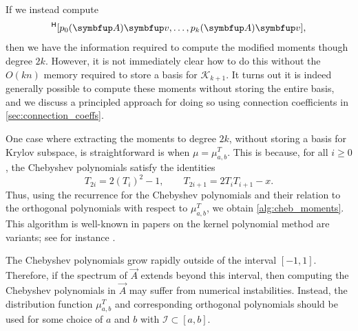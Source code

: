     If we instead compute 
    \begin{equation*}
        [ p_0\A\vec{v}, \ldots, p_{k}\A\vec{v}]^\cT
        [ p_0\A\vec{v}, \ldots, p_{k}\A\vec{v}],
    \end{equation*}
    then we have the information required to compute the modified moments though degree \( 2k \).
    However, it is not immediately clear how to do this without the \( O(kn) \) memory required to store a basis for \( \mathcal{K}_{k+1} \).
    It turns out it is indeed generally possible to compute these moments without storing the entire basis, and we discuss a principled approach for doing so using connection coefficients in \cref{sec:connection_coeffs}.

    One case where extracting the moments to degree \( 2k \), without storing a basis for Krylov subspace, is straightforward is when \( \mu = \mu_{a,b}^T \).
    This is because, for all \( i \geq 0 \), the Chebyshev polynomials satisfy the identities
    \begin{equation*}
        T_{2i} = 2 (T_i)^2 - 1 
        ,\qquad
        T_{2i+1} = 2 T_i T_{i+1} - x. 
    \end{equation*}
    Thus, using the recurrence for the Chebyshev polynomials and their relation to the orthogonal polynomials with respect to \( \mu_{a,b}^T \), we obtain \cref{alg:cheb_moments}.
    This algorithm is well-known in papers on the kernel polynomial method are variants; see for instance \cite{skilling_89,silver_roder_94,weisse_wellein_alvermann_fehske_06,hallman_21}.%

    \begin{remark}   
    The Chebyshev polynomials grow rapidly outside of the interval \( [-1,1] \).
    Therefore, if the spectrum of \( \vec{A} \) extends beyond this interval, then computing the Chebyshev polynomials in \( \vec{A} \) may suffer from numerical instabilities.
        Instead, the distribution function \( \mu_{a,b}^T \) and corresponding orthogonal polynomials should be used for some choice of \( a \) and \( b \) with \( \mathcal{I} \subset [a,b] \).

    \end{remark}


